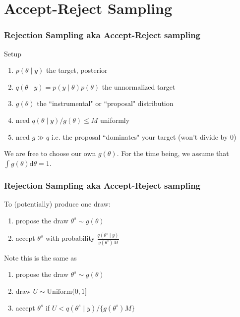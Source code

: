 \documentclass{beamer}
\begin{document}
\section{Accept-Reject Sampling}

\begin{frame}[fragile]
\frametitle{Rejection Sampling aka Accept-Reject sampling}

Setup
\begin{enumerate}
\item $p(\theta \mid y)$ the target, posterior
\item $q(\theta \mid y) = p(y \mid \theta) p(\theta)$ the unnormalized target
\item $g(\theta)$ the ``instrumental" or ``proposal" distribution
\item need $q(\theta \mid y) / g(\theta) \le M$ uniformly
\item need $g \gg q$ i.e. the proposal ``dominates" your target (won't divide by $0$)
\end{enumerate}
We are free to choose our own $g(\theta)$. For the time being, we assume that $\int g(\theta) \text{d}\theta = 1$.

\end{frame}
\begin{frame}[fragile]
\frametitle{Rejection Sampling aka Accept-Reject sampling}


To (potentially) produce one draw:
\begin{enumerate}
\item propose the draw $\theta^s \sim g(\theta)$
\item accept $\theta^s$ with probability $\frac{q(\theta^s \mid y) }{ g(\theta^s)  M }$
\end{enumerate}
\pause

Note this is the same as
\begin{enumerate}
\item propose the draw $\theta^s \sim g(\theta)$
\item draw $U \sim \text{Uniform}(0,1]$
\item accept $\theta^s$ if $U < q(\theta^s \mid y) / \{ g(\theta^s)  M\}$
\end{enumerate}


\end{frame}
\end{document}
